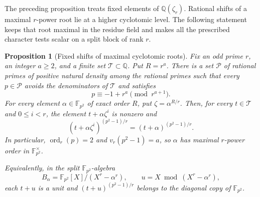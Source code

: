 \documentclass[11pt]{article}
\newcommand{\ord}{\operatorname{ord}}
\newtheorem{proposition}[theorem]{Proposition}
\theoremstyle{definition}
\theoremstyle{remark}
\begin{document}
The preceding proposition treats fixed elements of
$\mathbb Q(\zeta_r)$.  Rational shifts of a maximal $r$-power
root lie at a higher cyclotomic level.  The following statement
keeps that root maximal in the residue field and makes all the
prescribed character tests scalar on a split block of rank $r$.

\begin{proposition}[Fixed shifts of maximal cyclotomic roots]
\label{prop:fixed-shift-maximal-cyclotomic}
Fix an odd prime $r$, an integer $a\geq2$, and a finite set
$\mathcal T\subset\mathbb Q$.  Put $R=r^a$.
There is a set $\mathcal P$ of rational primes of positive natural
density among the rational primes such that every $p\in\mathcal P$ avoids the denominators
of $\mathcal T$ and satisfies
\[
 p\equiv-1+r^a\pmod{r^{a+1}}.
\]
For every element $\alpha\in\mathbb F_{p^2}$ of exact order $R$,
put $\zeta=\alpha^{R/r}$.  Then, for every $t\in\mathcal T$ and
$0\leq i<r$, the element $t+\alpha\zeta^i$ is nonzero and
\[
 (t+\alpha\zeta^i)^{(p^2-1)/r}
   =(t+\alpha)^{(p^2-1)/r}.
\]
In particular, $\ord_r(p)=2$ and $v_r(p^2-1)=a$, so $\alpha$
has maximal $r$-power order in $\mathbb F_{p^2}^{\times}$.

Equivalently, in the split \(\mathbb F_{p^2}\)-algebra
\[
 B_\alpha=\mathbb F_{p^2}[X]/(X^r-\alpha^r),
 \qquad u=X\bmod(X^r-\alpha^r),
\]
each $t+u$ is a unit and $(t+u)^{(p^2-1)/r}$ belongs to the
diagonal copy of $\mathbb F_{p^2}$.
\end{proposition}
\end{document}

